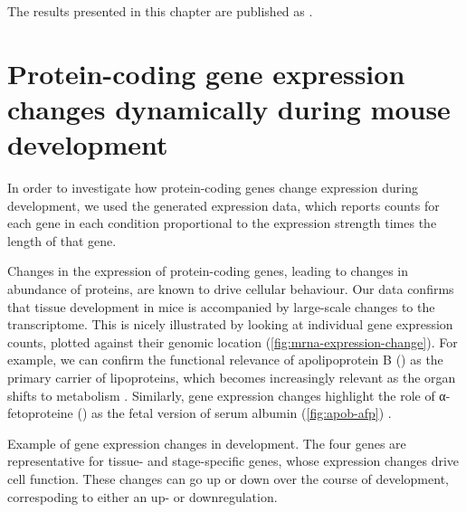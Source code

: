 The results presented in this chapter are published as \citet{Schmitt:2014}.


\section{Protein-coding gene expression changes dynamically during mouse
development}

In order to investigate how protein-coding genes change expression during
development, we used the generated \rnaseq expression data, which reports counts
for each gene in each condition proportional to the expression strength times
the length of that gene.

Changes in the expression of protein-coding genes, leading to changes in
abundance of proteins, are known to drive cellular behaviour. Our data
confirms that tissue development in mice is accompanied by large-scale changes
to the \mrna transcriptome. This is nicely illustrated by looking at individual
gene expression counts, plotted against their genomic location
(\cref{fig:mrna-expression-change}). For example, we can confirm the functional
relevance of apolipoprotein B () as the primary carrier of
lipoproteins, which becomes increasingly relevant as the organ shifts to
metabolism \citep{Knott:1986}. Similarly, \mrna gene expression changes
highlight the role of α-fetoproteine () as the fetal version of
serum albumin (\cref{fig:apob-afp}) \citep{Chen:1997}.

    {Example of gene expression changes in development.}
    {The four genes are representative for tissue- and stage-specific genes,
    whose expression changes drive cell function. These changes can go up or
    down over the course of development, correspoding to either an up- or
    downregulation.}


